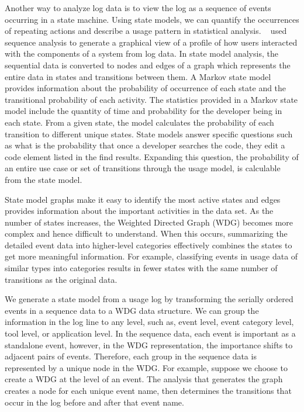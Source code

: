 Another way to analyze log data is to view the log as a sequence of events occurring in a state machine.  Using state models, we can quantify the occurrences of repeating actions and describe a usage pattern in statistical analysis.  ~ used sequence analysis to generate a graphical view of a profile of how users interacted with the components of a system from log data.  In state model analysis, the sequential data is converted to nodes and edges of a graph which represents the entire data in states and transitions between them.  A Markov state model provides information about the probability of occurrence of each state and the transitional probability of each activity.   The statistics provided in a Markov state model include the quantity of time and probability for the developer being in each state.  From a given state, the model calculates the probability of each transition to different unique states.  State models answer specific questions such as what is the probability that once a developer searches the code, they edit a code element listed in the find results. Expanding this question, the probability of an entire use case or set of transitions through the usage model, is calculable from the state model.  

State model graphs make it easy to identify the most active states and edges provides information about the important activities in the data set.  As the number of states increases, the Weighted Directed Graph (WDG) becomes more complex and hence difficult to understand.  When this occurs, summarizing the detailed event data into higher-level categories effectively combines the states to get more meaningful information.   For example, classifying events in usage data of similar types into categories results in fewer states with the same number of transitions as the original data.

We generate a state model from a usage log by transforming the serially ordered events in a sequence data to a WDG data structure. We can group the information in the log line to any level, such as, event level, event category level, tool level, or application level. In the sequence data, each event is important as a standalone event, however, in the WDG representation, the importance shifts to adjacent pairs of events. 
Therefore, each group in the sequence data is represented by a unique node in the WDG.  For example, suppose we choose to create a WDG at the level of an event.  The analysis that generates the graph creates a node for each unique event name, then determines the transitions that occur in the log before and after that event name.

